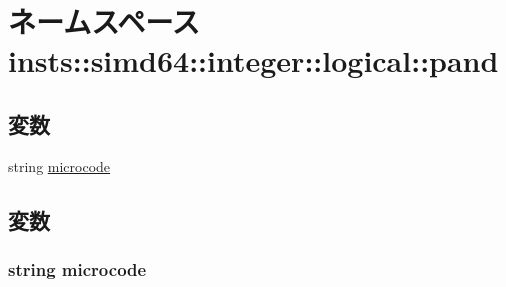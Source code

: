 \hypertarget{namespaceinsts_1_1simd64_1_1integer_1_1logical_1_1pand}{
\section{ネームスペース insts::simd64::integer::logical::pand}
\label{namespaceinsts_1_1simd64_1_1integer_1_1logical_1_1pand}
}
\subsection*{変数}
\begin{DoxyCompactItemize}
\item 
string \hyperlink{namespaceinsts_1_1simd64_1_1integer_1_1logical_1_1pand_a770f11a173e99389a8802f0107ed8f52}{microcode}
\end{DoxyCompactItemize}


\subsection{変数}
\hypertarget{namespaceinsts_1_1simd64_1_1integer_1_1logical_1_1pand_a770f11a173e99389a8802f0107ed8f52}{
\subsubsection[{microcode}]{\setlength{\rightskip}{0pt plus 5cm}string {\bf microcode}}}
\label{namespaceinsts_1_1simd64_1_1integer_1_1logical_1_1pand_a770f11a173e99389a8802f0107ed8f52}
